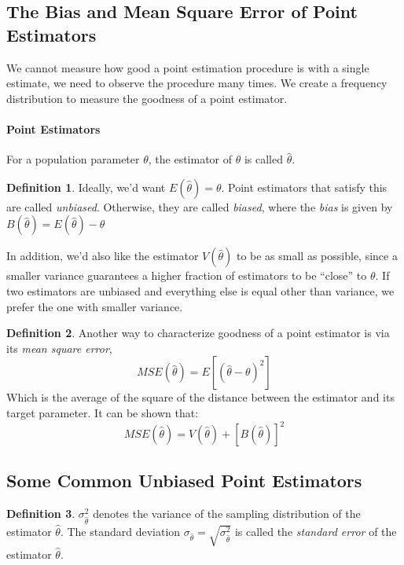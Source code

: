 \documentclass[12 pt]{article}
\theoremstyle{definition}
\newtheorem{defn}{Definition}
\begin{document}
        \subsection{The Bias and Mean Square Error of Point
          Estimators}
        We cannot measure how good a point estimation procedure is
        with a single estimate, we need to observe the procedure many
        times. We create a frequency distribution to measure the
        goodness of a point estimator.
        \paragraph{Point Estimators} For a population parameter
        $\theta$, the estimator of $\theta$ is called $\hat{\theta}$.
        \begin{defn}
        Ideally, we'd want $E(\hat{\theta}) = \theta$. Point
        estimators that satisfy this are called
        \textit{unbiased}. Otherwise, they are called \textit{biased},
        where the \textit{bias} is given by
        $B(\hat{\theta})=E(\hat{\theta})-\theta$
      \end{defn}
      In addition, we'd also like the estimator $V(\hat{\theta})$ to
      be as small as possible, since a smaller variance guarantees a
      higher fraction of estimators to be ``close'' to $\theta$. If
      two estimators are unbiased and everything else is equal other
      than variance, we prefer the one with smaller variance.
      \begin{defn}
        Another way to characterize goodness of a point estimator is
        via its \textit{mean square error},
        $$MSE(\hat{\theta}) = E[(\hat{\theta}-\theta)^2]$$
        Which is the average of the square of the distance between the
        estimator and its target parameter. It can be shown that:
        $$MSE(\hat{\theta})=V(\hat{\theta})+[B(\hat{\theta})]^2$$
      \end{defn}
      \subsection{Some Common Unbiased Point Estimators}
      \begin{defn}
        $\sigma_{\hat{\theta}}^2$ denotes the variance of the sampling
        distribution of the estimator $\hat{\theta}$. The standard
        deviation $\sigma_{\hat{\theta}} =
        \sqrt{\sigma_{\hat{\theta}}^2}$ is called the \textit{standard
        error} of the estimator $\hat{\theta}$.
    \end{defn}
\end{document}
